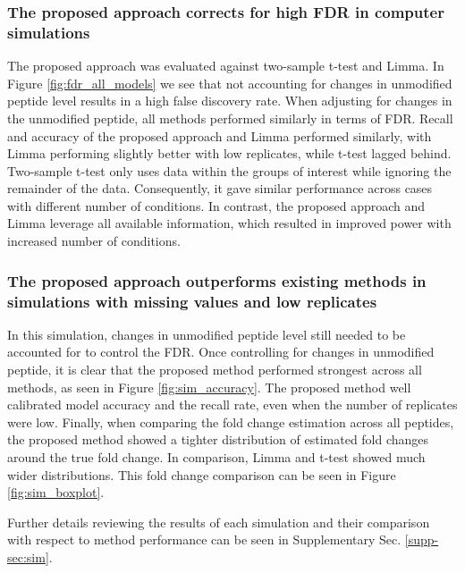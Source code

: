 \documentclass[mcp]{article}
\numberwithin{figure}{section} %
\numberwithin{table}{section}
\begin{document}
\subsubsection*{The proposed approach corrects for high FDR in computer simulations}

The proposed approach was evaluated against two-sample t-test and Limma. 
In Figure \ref{fig:fdr_all_models} we see that not accounting for changes in unmodified peptide level results in a high false discovery rate. When adjusting for changes in the unmodified peptide, all methods performed similarly in terms of FDR. Recall and accuracy of the proposed approach and Limma performed similarly, with Limma performing slightly better with low replicates, while t-test lagged behind. Two-sample t-test only uses data within the groups of interest while ignoring the remainder of the data. Consequently, it gave similar performance across cases with different number of conditions. In contrast, the proposed approach and Limma leverage all available information, which resulted in improved power with increased number of conditions.

\subsubsection*{The proposed approach outperforms existing methods in simulations with missing values and low replicates}

In this simulation, changes in unmodified peptide level still needed to be accounted for to control the FDR. Once controlling for changes in unmodified peptide, it is clear that the proposed method performed strongest across all methods, as seen in Figure \ref{fig:sim_accuracy}. The proposed method well calibrated model accuracy and the recall rate, even when the number of replicates were low. Finally, when comparing the fold change estimation across all peptides, the proposed method showed a tighter distribution of estimated fold changes around the true fold change. In comparison, Limma and t-test showed much wider distributions. This fold change comparison can be seen in Figure \ref{fig:sim_boxplot}. 

Further details reviewing the results of each simulation and their comparison with respect to method performance can be seen in Supplementary Sec. \ref{supp-sec:sim}. 

\end{document}
